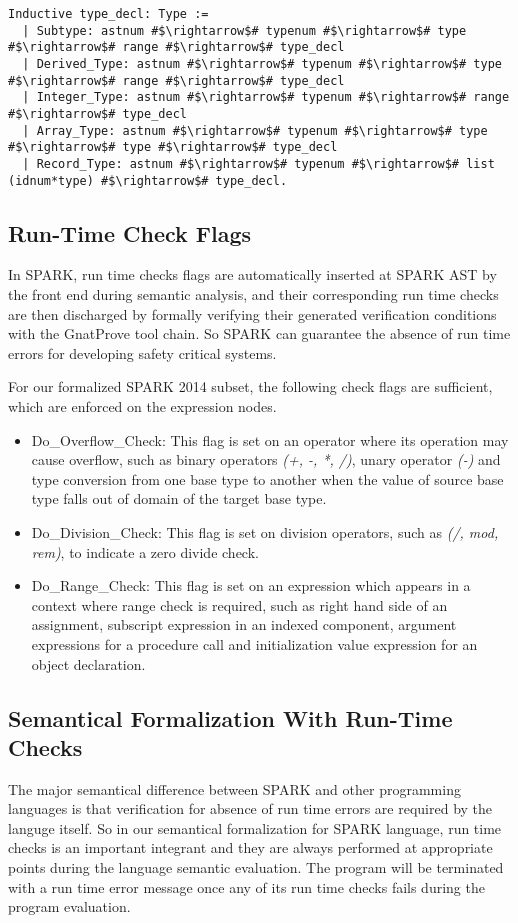 \begin{lstlisting}[escapechar=\#, language=coq, basicstyle=\small]
Inductive type_decl: Type := 
  | Subtype: astnum #$\rightarrow$# typenum #$\rightarrow$# type #$\rightarrow$# range #$\rightarrow$# type_decl 
  | Derived_Type: astnum #$\rightarrow$# typenum #$\rightarrow$# type #$\rightarrow$# range #$\rightarrow$# type_decl 
  | Integer_Type: astnum #$\rightarrow$# typenum #$\rightarrow$# range #$\rightarrow$# type_decl
  | Array_Type: astnum #$\rightarrow$# typenum #$\rightarrow$# type #$\rightarrow$# type #$\rightarrow$# type_decl 
  | Record_Type: astnum #$\rightarrow$# typenum #$\rightarrow$# list (idnum*type) #$\rightarrow$# type_decl.
\end{lstlisting}


\subsection{Run-Time Check Flags}
In SPARK, run time checks flags are automatically inserted at SPARK AST by the
front end during semantic analysis, and their corresponding run time checks are
then discharged by formally verifying their generated verification conditions
with the GnatProve tool chain. So SPARK can guarantee the absence of run time
errors for developing safety critical systems.

For our formalized SPARK 2014 subset, the following check flags are sufficient,
which are enforced on the expression nodes.
\begin{itemize}
\item 
  Do\_Overflow\_Check: This flag is set on an operator where its operation may
  cause overflow, such as binary operators \textit{(+, -, *, /)}, unary operator
  \textit{(-)} and type conversion from one base type to another when the value
  of source base type falls out of domain of the target base type.
\item 
  Do\_Division\_Check: This flag is set on division operators, such as
  \textit{(/, mod, rem)}, to indicate a zero divide check.
\item 
  Do\_Range\_Check: This flag is set on an expression which appears in a
  context where range check is required, such as right hand side of an
  assignment, subscript expression in an indexed component, argument expressions
  for a procedure call and initialization value expression for an object
  declaration.
\end{itemize}

\subsection{Semantical Formalization With Run-Time Checks}
The major semantical difference between SPARK and other programming languages is
that verification for absence of run time errors are required by the languge
itself.
So in our semantical formalization for SPARK language, run time checks is an
important integrant and they are always performed at appropriate points during
the language semantic evaluation. The program will be terminated with a run time
error message once any of its run time checks fails during the program
evaluation.

